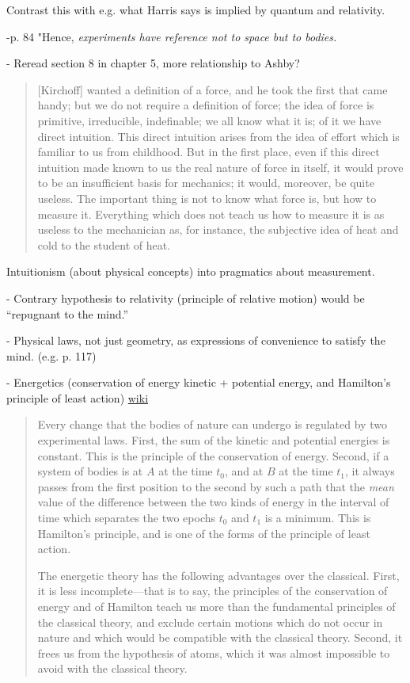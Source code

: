 \documentclass{article}
\begin{document}
Contrast this with e.g. what Harris says is implied by quantum and relativity.  

-p. 84 "Hence, \emph{experiments have reference not to space but to bodies.}

- Reread section 8 in chapter 5, more relationship to Ashby?

\begin{quote}
    [Kirchoff] wanted a definition of a force, and he took the first that came handy; but we do not require a definition of force; the idea of force is primitive, irreducible, indefinable; we all know what it is; of it we have direct intuition.  This direct intuition arises from the idea of effort which is familiar to us from childhood.  But in the first place, even if this direct intuition made known to us the real nature of force in itself, it would prove to be an insufficient basis for mechanics; it would, moreover, be quite useless.  The important thing is not to know what force is, but how to measure it.  Everything which does not teach us how to measure it is as useless to the mechanician as, for instance, the subjective idea of heat and cold to the student of heat.  
    \citep[p. 105-106]{Poincare1952}
\end{quote}

Intuitionism (about physical concepts) into pragmatics about measurement.

- Contrary hypothesis to relativity (principle of relative motion) would be ``repugnant to the mind.'' \citep[p. 111, 113]{Poincare1952}

- Physical laws, not just geometry, as expressions of convenience to satisfy the mind. (e.g. p. 117)


- Energetics (conservation of energy kinetic + potential energy, and Hamilton's principle of least action) \href{https://en.wikipedia.org/wiki/Hamilton%27s_principle}{wiki}

\begin{quote}
    Every change that the bodies of nature can undergo is regulated by two experimental laws.  First, the sum of the kinetic and potential energies is constant.  This is the principle of the conservation of energy.  Second, if a system of bodies is at $A$ at the time $t_0$, and at $B$ at the time $t_1$, it always passes from the first position to the second by such a path that the \emph{mean} value of the difference between the two kinds of energy in the interval of time which separates the two epochs $t_0$ and $t_1$ is a minimum.  This is Hamilton's principle, and is one of the forms of the principle of least action.  
    
    The energetic theory has the following advantages over the classical.  First, it is less incomplete---that is to say, the principles of the conservation of energy and of Hamilton teach us more than the fundamental principles of the classical theory, and exclude certain motions which do not occur in nature and which would be compatible with the classical theory.  Second, it frees us from the hypothesis of atoms, which it was almost impossible to avoid with the classical theory.  \citep[p. 123-124]{Poincare1952}
 \end{quote}
 
\end{document}
